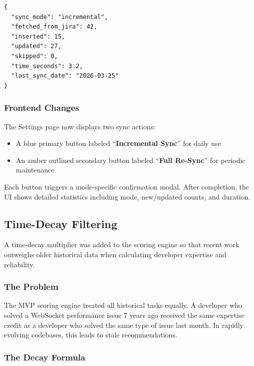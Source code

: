 \documentclass[12pt, a4paper]{article}
\begin{document}
\begin{lstlisting}[caption={Enriched sync response payload}]
{
  "sync_mode": "incremental",
  "fetched_from_jira": 42,
  "inserted": 15,
  "updated": 27,
  "skipped": 0,
  "time_seconds": 3.2,
  "last_sync_date": "2026-03-25"
}
\end{lstlisting}

\subsubsection{Frontend Changes}

The Settings page now displays two sync actions:

\begin{itemize}
    \item A blue primary button labeled ``\textbf{Incremental Sync}'' for daily use
    \item An amber outlined secondary button labeled ``\textbf{Full Re-Sync}'' for periodic maintenance
\end{itemize}

Each button triggers a mode-specific confirmation modal. After completion, the UI shows detailed statistics including mode, new/updated counts, and duration.


\subsection{Time-Decay Filtering}

A time-decay multiplier was added to the scoring engine so that recent work outweighs older historical data when calculating developer expertise and reliability.

\subsubsection{The Problem}

The MVP scoring engine treated all historical tasks equally. A developer who solved a WebSocket performance issue 7 years ago received the same expertise credit as a developer who solved the same type of issue last month. In rapidly evolving codebases, this leads to stale recommendations.

\subsubsection{The Decay Formula}
\end{document}
